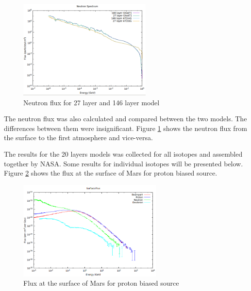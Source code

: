 \begin{figure}
 \begin{centering}
 \centering
 \includegraphics[width=0.4\linewidth,height=5cm]{../figs/neutron.png}
 \caption{Neutron flux for 27 layer and 146 layer model}
 \label{neutron}
 \end{centering}
\end{figure}


The neutron flux was also calculated and compared between the two models.
The differences between them were insignificant. Figure \ref{neutron}
shows the neutron flux from the surface to the first atmosphere and vice-versa.

The results for the 20 layers models was collected for all isotopes and assembled together
by NASA. Some results for individual isotopes will be presented below.
Figure \ref{surface20} shows the flux at the surface of Mars for proton biased source.
\begin{figure}
 \begin{centering}
 \centering
 \includegraphics[width=0.4\linewidth,height=5cm]{../figs/surface_z1.png}
 \caption{Flux at the surface of Mars for proton biased source}
 \label{surface20}
 \end{centering}
\end{figure}



